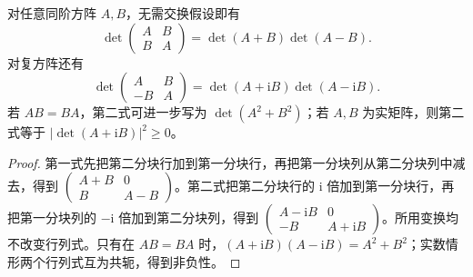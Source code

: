 \begin{proposition}
\label{prop:matrix-symmetric-block-determinants}
对任意同阶方阵 $A,B$，无需交换假设即有
\begin{equation}
 \det\begin{pmatrix}A&B\\B&A\end{pmatrix}
 =\det(A+B)\det(A-B).
 \label{eq:matrix-symmetric-block-determinant}
\end{equation}
对复方阵还有
\begin{equation}
 \det\begin{pmatrix}A&B\\-B&A\end{pmatrix}
 =\det(A+\mathrm iB)\det(A-\mathrm iB).
 \label{eq:matrix-complex-block-determinant}
\end{equation}
若 $AB=BA$，第二式可进一步写为 $\det(A^2+B^2)$；若 $A,B$ 为实矩阵，则第二式等于 $|\det(A+\mathrm iB)|^2\ge0$。
\end{proposition}
\begin{proof}
第一式先把第二分块行加到第一分块行，再把第一分块列从第二分块列中减去，得到 $\begin{pmatrix}A+B&0\\B&A-B\end{pmatrix}$。第二式把第二分块行的 $\mathrm i$ 倍加到第一分块行，再把第一分块列的 $-\mathrm i$ 倍加到第二分块列，得到 $\begin{pmatrix}A-\mathrm iB&0\\-B&A+\mathrm iB\end{pmatrix}$。所用变换均不改变行列式。只有在 $AB=BA$ 时，$(A+\mathrm iB)(A-\mathrm iB)=A^2+B^2$；实数情形两个行列式互为共轭，得到非负性。
\end{proof}

